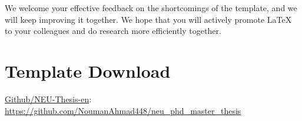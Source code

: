 We welcome your effective feedback on the shortcomings of the template, and we will keep improving it together. We hope that you will actively promote \LaTeX{} to your colleagues and do research more efficiently together.

\section{Template Download}

\begin{center}
    \href{https://github.com/NoumanAhmad448/neu_phd_master_thesis}{Github/NEU-Thesis-en}: \url{https://github.com/NoumanAhmad448/neu_phd_master_thesis}
\end{center}


